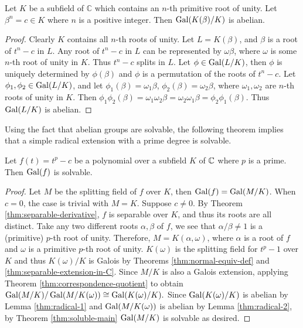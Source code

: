 \begin{lemma} \label{thm:radical-2}
	Let $K$ be a subfield of $\mathbb{C}$ which contains an $n$-th primitive root of unity. Let $\beta^n = c \in K $ where $n$ is a positive integer. Then $\operatorname{Gal}(K(\beta) / K)$ is abelian.
\end{lemma}

\begin{proof}
	Clearly $K$ contains all $n$-th roots of unity. Let $L = K(\beta)$, and $\beta$ is a root of $t^n-c$ in $L$. Any root of $t^n-c$ in $L$ can be represented by $\omega \beta$, where $\omega$ is some $n$-th root of unity in $K$. Thus $t^n - c$ splits in $L$.  Let $\phi \in \operatorname{Gal}(L / K)$, then $\phi$ is uniquely determined by $\phi(\beta)$ and $\phi$ is a permutation of the roots of $t^n - c$. Let $\phi_1, \phi_2 \in \operatorname{Gal}(L / K)$, and let $\phi_1(\beta) = \omega_1\beta$, $\phi_2(\beta) = \omega_2\beta$, where $\omega_1, \omega_2$ are $n$-th roots of unity in $K$. Then
	$
	\phi_1 \phi_2(\beta)=\omega_1 \omega_2 \beta=\omega_2 \omega_1  \beta=\phi_2 \phi_1(\beta).
	$
	Thus $\operatorname{Gal}(L / K)$ is abelian.
\end{proof}
Using the fact that abelian groups are solvable, the following theorem implies that a simple radical extension with a prime degree is solvable. 
\begin{theorem} \label{thm:radical-simple-solvable}
	Let $f(t) = t^p - c$ be a polynomial over a subfield $K$ of $\mathbb C$ where $p$ is a prime. Then $\operatorname{Gal}(f)$ is solvable. 
\end{theorem}
\begin{proof}
	Let $M$ be the splitting field of $f$ over $K$, then $\operatorname{Gal}(f) = \operatorname{Gal}(M / K)$. 
	When $c = 0$, the case is trivial with $M = K$. Suppose $c \neq 0$. By Theorem \ref{thm:separable-derivative}, $f$ is separable over $K$, and thus its roots are all distinct. Take any two different roots $\alpha, \beta$ of $f$, we see that $\alpha / \beta \neq 1$ is a (primitive) $p$-th root of unity. Therefore, $M = K(\alpha, \omega)$, where $\alpha$ is a root of $f$ and $\omega$ is a primitive $p$-th root of unity. $K(\omega)$ is the splitting field for $t^p - 1$ over $K$ and thus $K(\omega) / K$ is Galois by Theorems \ref{thm:normal-equiv-def} and \ref{thm:separable-extension-in-C}.  Since $M / K$ is also a Galois extension, applying Theorem \ref{thm:correspondence-quotient} to obtain $\operatorname{Gal}(M / K) / \operatorname{Gal}(M / K(\omega)) \cong \operatorname{Gal}(K(\omega) / K). $
	Since $\operatorname{Gal}(K(\omega)/K)$ is abelian by Lemma \ref{thm:radical-1} and $\operatorname{Gal}(M / K(\omega))$ is abelian by Lemma \ref{thm:radical-2}, by Theorem \ref{thm:soluble-main} $\operatorname{Gal}(M/K)$ is solvable as desired. 
\end{proof}

